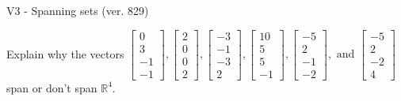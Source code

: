 \begin{exercise}
  \begin{exerciseTitle}V3 - Spanning sets (ver. 829)\end{exerciseTitle}
  \begin{exerciseStatement}
    Explain why the vectors \(\left[\begin{array}{r}
0 \\
3 \\
-1 \\
-1
\end{array}\right] , \left[\begin{array}{r}
2 \\
0 \\
0 \\
2
\end{array}\right] , \left[\begin{array}{r}
-3 \\
-1 \\
-3 \\
2
\end{array}\right] , \left[\begin{array}{r}
10 \\
5 \\
5 \\
-1
\end{array}\right] , \left[\begin{array}{r}
-5 \\
2 \\
-1 \\
-2
\end{array}\right] , \text{ and } \left[\begin{array}{r}
-5 \\
2 \\
-2 \\
4
\end{array}\right]\) span or don't span \(\mathbb{R}^4\). 
	



\end{exerciseStatement}
\end{exercise}
